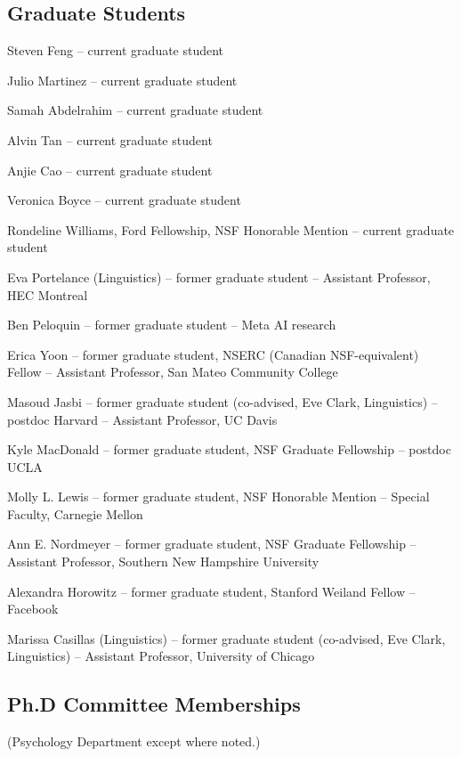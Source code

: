 \documentclass{article}
\renewenvironment{itemize}{
\begin{list}{}{
  \setlength{\leftmargin}{1.5em}
  }
  }{
\end{list}
}
\begin{document}
\subsection*{Graduate Students}
\begin{itemize}
  \item Steven Feng -- current graduate student
  \item Julio Martinez -- current graduate student
  \item Samah Abdelrahim -- current graduate student
  \item Alvin Tan -- current graduate student
  \item Anjie Cao -- current graduate student
  \item Veronica Boyce -- current graduate student
  \item Rondeline Williams, Ford Fellowship, NSF Honorable Mention -- current graduate student
  \item Eva Portelance (Linguistics) -- former graduate student -- Assistant Professor, HEC Montreal
  \item Ben Peloquin -- former graduate student -- Meta AI research
  \item Erica Yoon -- former graduate student, NSERC (Canadian NSF-equivalent) Fellow -- Assistant Professor, San Mateo Community College
  \item Masoud Jasbi -- former graduate student (co-advised, Eve Clark, Linguistics) -- postdoc Harvard -- Assistant Professor, UC Davis
  \item Kyle MacDonald -- former graduate student, NSF Graduate Fellowship -- postdoc UCLA
  \item Molly L. Lewis -- former graduate student, NSF Honorable Mention -- Special Faculty, Carnegie Mellon
  \item Ann E. Nordmeyer -- former graduate student, NSF Graduate Fellowship -- Assistant Professor, Southern New Hampshire University
  \item Alexandra Horowitz -- former graduate student, Stanford Weiland Fellow -- Facebook
  \item Marissa Casillas (Linguistics) -- former graduate student (co-advised, Eve Clark, Linguistics) -- Assistant Professor, University of Chicago
\end{itemize}

\subsection*{Ph.D Committee Memberships}
(Psychology Department except where noted.)
\end{document}
